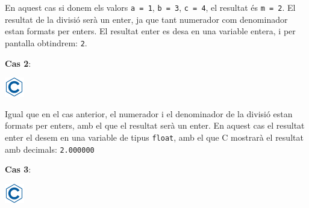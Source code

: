 \documentclass[]{book}
\newenvironment{Shaded}{\begin{snugshade}}{\end{snugshade}}
\newcommand{\DataTypeTok}[1]{\textcolor[rgb]{0.13,0.29,0.53}{#1}}
\newcommand{\DecValTok}[1]{\textcolor[rgb]{0.00,0.00,0.81}{#1}}
\newcommand{\FloatTok}[1]{\textcolor[rgb]{0.00,0.00,0.81}{#1}}
\newcommand{\StringTok}[1]{\textcolor[rgb]{0.31,0.60,0.02}{#1}}
\newcommand{\ImportTok}[1]{#1}
\newcommand{\ControlFlowTok}[1]{\textcolor[rgb]{0.13,0.29,0.53}{\textbf{#1}}}
\newcommand{\PreprocessorTok}[1]{\textcolor[rgb]{0.56,0.35,0.01}{\textit{#1}}}
\newcommand{\NormalTok}[1]{#1}
\begin{document}
En aquest cas si donem els valors \texttt{a\ =\ 1}, \texttt{b\ =\ 3},
\texttt{c\ =\ 4}, el resultat és \texttt{m\ =\ 2}. El resultat de la
divisió serà un enter, ja que tant numerador com denominador estan
formats per enters. El resultat enter es desa en una variable entera, i
per pantalla obtindrem: \texttt{2}.

\textbf{Cas 2}:

\includegraphics{./img/c.png}

\begin{Shaded}
\end{Shaded}

Igual que en el cas anterior, el numerador i el denominador de la
divisió estan formats per enters, amb el que el resultat serà un enter.
En aquest cas el resultat enter el desem en una variable de tipus
\texttt{float}, amb el que C mostrarà el resultat amb decimals:
\texttt{2.000000}

\textbf{Cas 3}:

\includegraphics{./img/c.png}

\begin{Shaded}
\end{Shaded}
\end{document}
